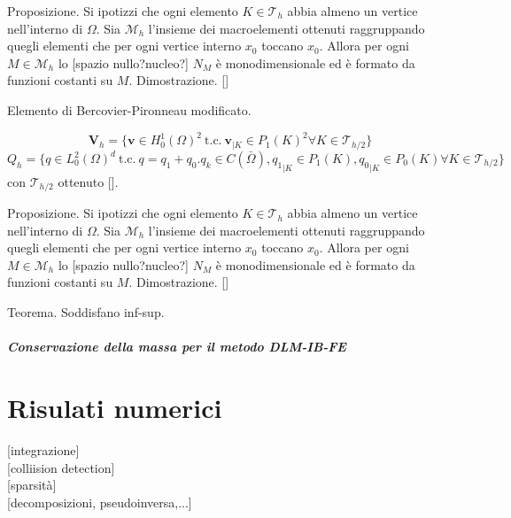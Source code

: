 \documentclass{book}
\newcommand{\tc}{\ \text{t.c.}\ }
\begin{document}
Proposizione. Si ipotizzi che ogni elemento $ K\in\mathcal{T}_h$ abbia almeno un vertice nell'interno di $\Omega$. Sia $\mathcal{M}_h$ l'insieme dei macroelementi ottenuti raggruppando quegli elementi che per ogni vertice interno $x_0$ toccano $x_0$. Allora per ogni $M\in\mathcal{M}_h$ lo [spazio nullo?nucleo?] $N_M$ è monodimensionale ed è formato da funzioni costanti su $M$.
Dimostrazione. []

Elemento di Bercovier-Pironneau modificato.

$$\mathbf{V}_h=\{\mathbf{v}\in H^1_0(\Omega)^2\tc\mathbf{v}_{\vert K}\in P_{1}(K)^2\forall K\in\mathcal{T}_{h/2} \}$$
$$Q_h=\{ q\in L^2_0(\Omega)^d\tc q=q_1+q_0. q_k\in C(\bar{\Omega}),{q_1}_{\vert K}\in P_1(K), {q_0}_{\vert K}\in P_0(K)\forall K\in\mathcal{T}_{h/2} \}$$
con $\mathcal{T}_{h/2}$ ottenuto []. 

Proposizione. Si ipotizzi che ogni elemento $ K\in\mathcal{T}_h$ abbia almeno un vertice nell'interno di $\Omega$. Sia $\mathcal{M}_h$ l'insieme dei macroelementi ottenuti raggruppando quegli elementi che per ogni vertice interno $x_0$ toccano $x_0$. Allora per ogni $M\in\mathcal{M}_h$ lo [spazio nullo?nucleo?] $N_M$ è monodimensionale ed è formato da funzioni costanti su $M$.
Dimostrazione. []

Teorema. Soddisfano inf-sup.

\paragraph{Conservazione della massa per il metodo DLM-IB-FE}

\chapter{Risulati numerici}
[integrazione]\\

[colliision detection]\\

[sparsità]\\

[decomposizioni, pseudoinversa,...]\\
\end{document}
